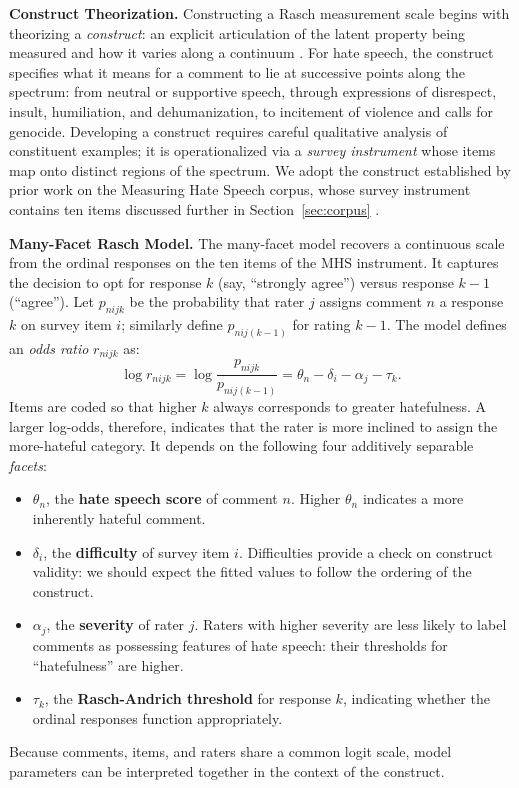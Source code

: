 \documentclass[11pt]{article}
\begin{document}
\textbf{Construct Theorization.} Constructing a Rasch measurement scale begins with theorizing a \textit{construct}: an explicit articulation of the latent property being measured and how it varies along a continuum \cite{Wallach2025GenAIMeasurement}. For hate speech, the construct specifies what it means for a comment to lie at successive points along the spectrum: from neutral or supportive speech, through expressions of disrespect, insult, humiliation, and dehumanization, to incitement of violence and calls for genocide. Developing a construct requires careful qualitative analysis of constituent examples; it is operationalized via a \textit{survey instrument} whose items map onto distinct regions of the spectrum. We adopt the construct established by prior work on the Measuring Hate Speech corpus, whose survey instrument contains ten items discussed further in Section~\ref{sec:corpus} \cite{DBLP:journals/corr/abs-2009-10277, sachdeva-etal-2022-measuring}.

\textbf{Many-Facet Rasch Model.} The many-facet model recovers a continuous scale from the ordinal responses on the ten items of the MHS instrument. It captures the decision to opt for response $k$ (say, ``strongly agree'') versus response $k-1$ (``agree''). Let $p_{nijk}$ be the probability that rater $j$ assigns comment $n$ a response $k$ on survey item $i$; similarly define $p_{nij(k-1)}$ for rating $k-1$. The model defines an \textit{odds ratio} $r_{nijk}$ as:
\begin{equation}
    \log r_{nijk} = \log \frac{p_{nijk}}{p_{nij(k-1)}} = \theta_n - \delta_i - \alpha_j - \tau_{k}. \label{eqn:base_irt}
\end{equation}
Items are coded so that higher $k$ always corresponds to greater hatefulness. A larger log-odds, therefore, indicates that the rater is more inclined to assign the more-hateful category. It depends on the following four additively separable \textit{facets}:
\begin{itemize}
    \item $\theta_n$, the \textbf{hate speech score} of comment $n$. Higher $\theta_n$ indicates a more inherently hateful comment. 
    \item $\delta_i$, the \textbf{difficulty} of survey item $i$. Difficulties provide a check on construct validity: we should expect the fitted values to follow the ordering of the construct.
    \item $\alpha_j$, the \textbf{severity} of rater $j$. Raters with higher severity are less likely to label comments as possessing features of hate speech: their thresholds for ``hatefulness'' are higher.
    \item $\tau_k$, the \textbf{Rasch-Andrich threshold} for response $k$, indicating whether the ordinal responses function appropriately.
\end{itemize}
Because comments, items, and raters share a common logit scale, model parameters can be interpreted together in the context of the construct.
\end{document}
